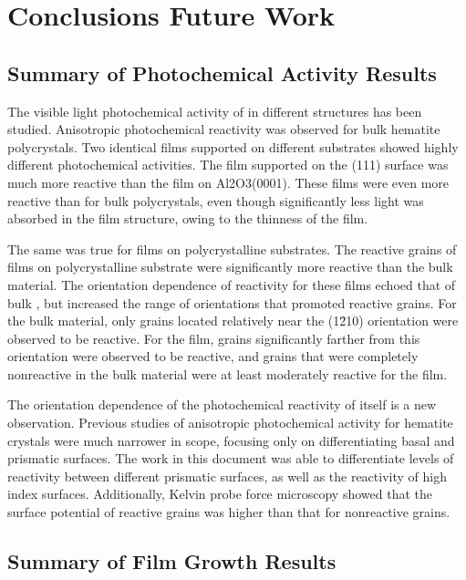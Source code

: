 

\chapter{Conclusions \oldand Future Work}
\label{ch:conclusions}


\section{Summary of Photochemical Activity
Results}\label{sec:conclusions.photochemc.summary}


The visible light photochemical activity of  in different structures has been
studied. Anisotropic photochemical reactivity was observed for bulk hematite polycrystals. 
Two identical  films supported on different substrates showed highly
different photochemical activities. The film supported on the (111) surface was
much more reactive than the film on Al2O3(0001). These films were even more reactive than
for bulk  polycrystals, even though significantly less light was absorbed in the
film structure, owing to the thinness of the film. 

The same was true for films on polycrystalline  substrates. The reactive grains
of films on polycrystalline substrate were significantly more reactive than the bulk
material. The orientation dependence of reactivity for these films echoed that of bulk
, but increased the range of orientations that promoted reactive grains. For the
bulk material, only grains located relatively near the (1\={2}10) orientation were
observed to be reactive. For the film, grains significantly farther from this orientation
were observed to be reactive, and grains that were completely nonreactive in the bulk
material were at least moderately reactive for the film.

The orientation dependence of the photochemical reactivity of  itself is a new
observation. Previous studies of anisotropic photochemical activity for hematite crystals
were much narrower in scope, focusing only on differentiating basal and prismatic
surfaces. The work in this document was able to differentiate levels of reactivity between
different prismatic surfaces, as well as the reactivity of high index surfaces.
Additionally, Kelvin probe force microscopy showed that the surface potential of reactive
grains was higher than that for nonreactive grains.


\section{Summary of Film Growth Results}
\label{sec:conclusions.growth.summary}


